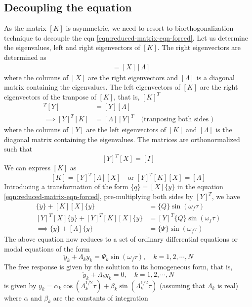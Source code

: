 \subsection{Decoupling the equation} As the matrix $[K]$ is asymmetric, we need to resort to biorthogonalization technique to decouple the eqn \ref{eqn:reduced-matrix-eqn-forced}.
Let us determine the eigenvalues, left and right eigenvectors of $[K]$. The right eigenvectors are determined as
\begin{align*}
[K][X] &= [X][\Lambda] 
\end{align*}
where the columns of $[X]$ are the right eigenvectors and $[\Lambda]$ is a diagonal matrix containing the eigenvalues.
The left eigenvectors of $[K]$ are the right eigenvectors of the tranpose of  $[K]$, that is, $[K]^T$
\begin{align*}
[K]^T[Y] &= [Y][\Lambda] \\
\implies [Y]^T[K] &= [\Lambda][Y]^T \quad \text{(tranposing both sides )}
\end{align*}
where the columns of $[Y]$ are the left eigenvectors of $[K]$ and $[\Lambda]$ is the diagonal matrix containing the eigenvalues.
The matrices are orthonormalized such that 
$$[Y]^T[X] = [I]$$
We can express $[K]$ as 
$$[K]=  [Y]^T[\Lambda][X]\quad \text{or } [Y]^T[K][X] = [\Lambda] $$
Introducing a transformation of the form $\{q\} = [X]\{y\}$ in the equation \ref{eqn:reduced-matrix-eqn-forced}, pre-multiplying both sides by $[Y]^T$, we have
\begin{align*}
[I][X]\{\ddot{y}\} + [K][X]\{y\} &= \{Q\}\sin(\omega_f \tau) \\
[Y]^T[X]\{\ddot{y}\} + [Y]^T[K][X]\{y\} &= [Y]^T\{Q\}\sin(\omega_f \tau) \\
\implies \{\ddot{y}\} + [\Lambda]\{y\} &= \{\Psi\}\sin(\omega_f \tau)
\end{align*}
The above equation now reduces to a set of ordinary differential equations or modal equations of the form
\begin{equation}
\ddot{y}_k + \Lambda_k y_k = \Psi_k \sin(\omega_f \tau), \quad k=1,2,\cdots, N \label{eqn:uncoupled-eqn-forced}
\end{equation}
The free response is given by the solution to its homogeneous form, that is,
\begin{equation}
\ddot{y}_k + \Lambda_k y_k = 0, \quad k=1,2,\cdots, N
\end{equation}
is given by $y_k = \alpha_k \cos(\Lambda_k^{1/2}\tau) + \beta_k \sin(\Lambda_k^{1/2}\tau)$ (assuming that $\Lambda_k$ is real) where $\alpha$ and $\beta_k$ are the constants of integration
